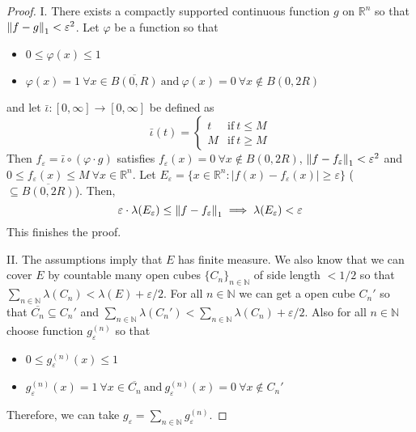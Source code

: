 \documentclass[11pt]{article}
\theoremstyle{definition}
\theoremstyle{proof}
\begin{document}
\begin{proof}
    I\@. There exists a compactly supported continuous function $g$ on $\mathbb{R}^{n}$ so that $\norm{f - g}_1 < \varepsilon ^2$.
    Let $\varphi$ be a function so that
    \begin{itemize}[]
        \item $0 \leq \varphi (x) \leq 1$
        \item $\varphi (x) = 1 \ \forall x \in \overline{B(0, R)} \ \text{and} \ \varphi (x) = 0 \ \forall x \notin B(0, 2R)$
    \end{itemize}
    and let $\bar{\iota } : [0, \infty] \to [0, \infty]$ be defined as
    \[
        \bar{\iota } (t) =
        \begin{cases}
            t & \text{if} \ t \leq M \\
            M & \text{if} \ t \geq M
        \end{cases}
    \]
    Then $f_ \varepsilon = \bar{\iota } \circ (\varphi \cdot g)$ satisfies $f_ \varepsilon (x) = 0 \ \forall x \notin B(0, 2R)$, $\norm{f-f_ \varepsilon }_1 < \varepsilon ^2$ and $0 \leq f_ \varepsilon (x) \leq M \ \forall x \in \mathbb{R}^{n}$.
    Let $E_ \varepsilon = \{x \in \mathbb{R}^{n} : |f(x) - f_ \varepsilon (x)| \geq \varepsilon \}$ \big($\subseteq \overline{B(0, 2R)}$\big).
    Then,
    \[
        \varepsilon \cdot \lambda (E_ \varepsilon ) \leq \norm{f - f_ \varepsilon }_1 \implies \lambda (E_ \varepsilon ) < \varepsilon
    \]
    This finishes the proof.

    II\@. The assumptions imply that $E$ has finite measure.
    We also know that we can cover $E$ by countable many open cubes $\{C_n\}_{n \in \mathbb{N}}$ of side length $< 1/2$ so that $\sum\limits_{n \in \mathbb{N}} \lambda (C_n) < \lambda (E) + \varepsilon /2$.
    For all $n \in \mathbb{N}$ we can get a open cube $C_n '$ so that $\overline{C_n} \subseteq C_n '$ and $\sum\limits_{n \in \mathbb{N}} \lambda (C_n ') < \sum\limits_{n \in \mathbb{N}} \lambda (C_n) + \varepsilon /2$.
    Also for all $n \in \mathbb{N}$ choose function $g_ \varepsilon ^{(n)}$ so that
    \begin{itemize}[]
        \item $0 \leq g_ \varepsilon ^{(n)}(x) \leq 1$
        \item $g_ \varepsilon ^{(n)}(x) = 1 \ \forall x \in \overline{C_n} \ \text{and} \ g_ \varepsilon ^{(n)}(x) = 0 \ \forall x \notin C_n '$
    \end{itemize}
    Therefore, we can take $g_ \varepsilon = \sum\limits_{n \in \mathbb{N}} g_ \varepsilon ^{(n)}$.
\end{proof}
\end{document}
